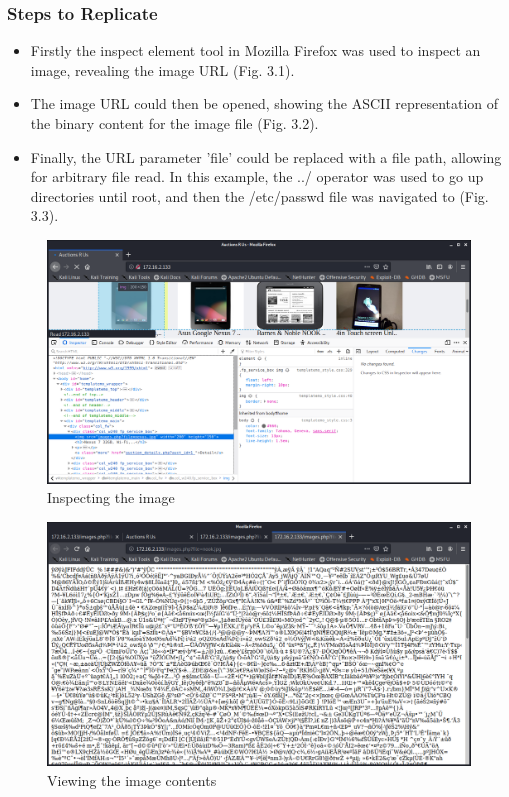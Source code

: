 \documentclass{report}
\begin{document}
\subsubsection{Steps to Replicate}
\begin{itemize}
		\item Firstly the inspect element tool in Mozilla Firefox was used to inspect an image, revealing the image URL (Fig. 3.1).
		\item The image URL could then be opened, showing the ASCII representation of the binary content for the image file (Fig. 3.2).
		\item Finally, the URL parameter 'file' could be replaced with a file path, allowing for arbitrary file read. In this example, the ../ operator was used to go up directories until root, and then the /etc/passwd file was navigated to (Fig. 3.3).
\end{itemize}
\begin{figure}[!htb]
	\centering
	\includegraphics[scale=0.4]{img/pathtraversal1.png}
	\caption{Inspecting the image}
\end{figure}
\begin{figure}[!htb]
	\centering
	\includegraphics[scale=0.4]{img/pathtraversal2.png}
	\caption{Viewing the image contents}
\end{figure}
\end{document}

